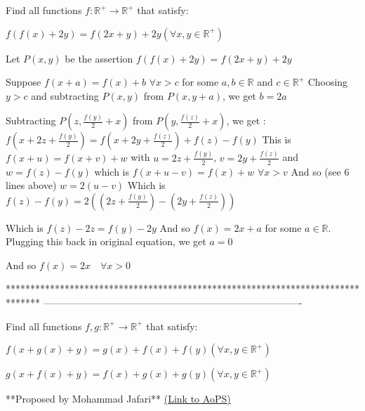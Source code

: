 \begin{solution}
	\begin{tcolorbox}Find all functions $f:\mathbb{R}^{+} \to \mathbb{R}^{+}$ that satisfy:

$f(f(x)+2y)=f(2x+y)+2y (\forall x,y \in \mathbb{R}^{+})$\end{tcolorbox}
Let $P(x,y)$ be the assertion $f(f(x)+2y)=f(2x+y)+2y$

Suppose $f(x+a)=f(x)+b$ $\forall x>c$ for some $a,b\in\mathbb R$ and $c\in\mathbb R^+$
Choosing $y>c$ and subtracting $P(x,y)$ from $P(x,y+a)$, we get $b=2a$

Subtracting $P(z,\frac{f(y)}2+x)$ from $P(y,\frac{f(z)}2+x)$, we get :
$f(x+2z+\frac{f(y)}2)=f(x+2y+\frac{f(z)}2)+f(z)-f(y)$
This is $f(x+u)=f(x+v)+w$ with $u=2z+\frac{f(y)}2$, $v=2y+\frac{f(z)}2$ and $w=f(z)-f(y)$
which is $f(x+u-v)=f(x)+w$ $\forall x>v$
And so (see 6 lines above) $w=2(u-v)$ 
Which is $f(z)-f(y)=2((2z+\frac{f(y)}2)-(2y+\frac{f(z)}2))$

Which is $f(z)-2z=f(y)-2y$
And so $f(x)=2x+a$ for some $a\in\mathbb R$.
Plugging this back in original equation, we get $a=0$

And so $\boxed{f(x)=2x\quad\forall x>0}$



\end{solution}
*******************************************************************************
-------------------------------------------------------------------------------

\begin{problem}
	Find all functions $f,g:\mathbb{R}^{+} \to \mathbb{R}^{+}$ that satisfy:

$f(x+g(x)+y)=g(x)+f(x)+f(y) (\forall x,y \in \mathbb{R}^{+})$

$g(x+f(x)+y)=f(x)+g(x)+g(y) (\forall x,y \in \mathbb{R}^{+})$

**Proposed by Mohammad Jafari**
	\flushright \href{https://artofproblemsolving.com/community/c6h1611731}{(Link to AoPS)}
\end{problem}



